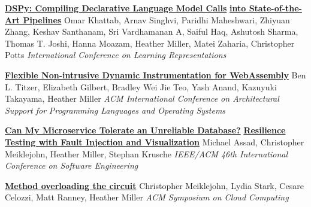 \documentclass[9pt]{article}
\begin{document}
\noindent\href{https://openreview.net/forum?id=sY5N0zY5Od}{\bf DSPy: Compiling Declarative Language Model Calls}\vspace{-0.03in}
\newline\noindent\href{https://openreview.net/forum?id=sY5N0zY5Od}{\bf into State-of-the-Art Pipelines}
\newline\noindent Omar Khattab, Arnav Singhvi, Paridhi Maheshwari, Zhiyuan Zhang,\vspace{-0.03in} 
\newline\noindent Keshav Santhanam, Sri Vardhamanan A, Saiful Haq, Ashutosh Sharma,\vspace{-0.03in} 
\newline\noindent Thomas T. Joshi, Hanna Moazam, Heather Miller, Matei Zaharia, Christopher Potts
\newline\noindent\emph{International Conference on Learning Representations}
\bigskip

\noindent\href{https://dl.acm.org/doi/10.1145/3620666.3651338}{\bf Flexible Non-intrusive Dynamic Instrumentation for WebAssembly}
\newline\noindent Ben L. Titzer, Elizabeth Gilbert, Bradley Wei Jie Teo, Yash Anand,\vspace{-0.03in}
\newline\noindent Kazuyuki Takayama, Heather Miller
\newline\noindent\emph{ACM International Conference on Architectural Support for}\vspace{-0.03in} 
\newline\noindent\emph{Programming Languages and Operating Systems}
\bigskip

\noindent\href{https://dl.acm.org/doi/10.1145/3639478.3640021}{\bf Can My Microservice Tolerate an Unreliable Database?}\vspace{-0.03in}
\newline\noindent\href{https://dl.acm.org/doi/10.1145/3639478.3640021}{\bf Resilience Testing with Fault Injection and Visualization}
\newline\noindent Michael Assad, Christopher Meiklejohn, Heather Miller, Stephan Krusche
\newline\noindent\emph{IEEE/ACM 46th International Conference on Software Engineering}
\bigskip

\noindent\href{https://dl.acm.org/doi/10.1145/3542929.3563466}{\bf Method overloading the circuit}
\newline\noindent Christopher Meiklejohn, Lydia Stark, Cesare Celozzi, Matt Ranney, Heather Miller
\newline\noindent\emph{ACM Symposium on Cloud Computing}
\bigskip
\end{document}
